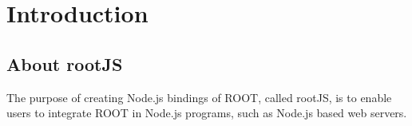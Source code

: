 \chapter{Introduction}
\section{About rootJS}
The purpose of creating Node.js bindings of ROOT, called rootJS, is to enable users to integrate ROOT in Node.js programs, such as Node.js based web servers. 